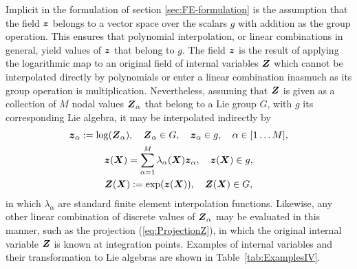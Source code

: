 \documentclass[12pt]{article}
\begin{document}
Implicit in the formulation of section \ref{sec:FE-formulation} is the
assumption that the field ${\boldsymbol{z}}$ belongs to a vector space over the
scalars $g$ with addition as the group operation.  This ensures that
polynomial interpolation, or linear combinations in general, yield
values of ${\boldsymbol{z}}$ that belong to $g$. The field ${\boldsymbol{z}}$ is the result of
applying the logarithmic map to an original field of internal
variables ${\boldsymbol{Z}}$ which cannot be interpolated directly by polynomials
or enter a linear combination inasmuch as its group operation is
multiplication.  Nevertheless, assuming that ${\boldsymbol{Z}}$ is given as a
collection of $M$ nodal values ${\boldsymbol{Z}}_\alpha$ that belong to a Lie group
$G$, with $g$ its corresponding Lie algebra, it may be interpolated
indirectly by
\begin{gather} \label{eq:InterpolationBegin}
  {\boldsymbol{z}}_\alpha := \log({\boldsymbol{Z}}_\alpha),
  \quad {\boldsymbol{Z}}_\alpha \in G,
  \quad {\boldsymbol{z}}_\alpha \in g,
  \quad \alpha \in [1 \ldots M],
  \\
  {\boldsymbol{z}}({\boldsymbol{X}}) = \sum_{\alpha=1}^M \lambda_\alpha({\boldsymbol{X}}) {\boldsymbol{z}}_\alpha,
  \quad {\boldsymbol{z}}({\boldsymbol{X}}) \in g,
  \\
  {\boldsymbol{Z}}({\boldsymbol{X}}) := \exp({\boldsymbol{z}}({\boldsymbol{X}})),
  \quad {\boldsymbol{Z}}({\boldsymbol{X}}) \in G, \label{eq:InterpolationEnd}
\end{gather}
in which $\lambda_\alpha$ are standard finite element interpolation
functions.  Likewise, any other linear combination of discrete values
of ${\boldsymbol{Z}}_\alpha$ may be evaluated in this manner, such as the
projection (\ref{eq:ProjectionZ}), in which the original internal
variable ${\boldsymbol{Z}}$ is known at integration points. Examples of internal
variables and their transformation to Lie algebras are shown in
Table~\ref{tab:ExamplesIV}.
\end{document}
